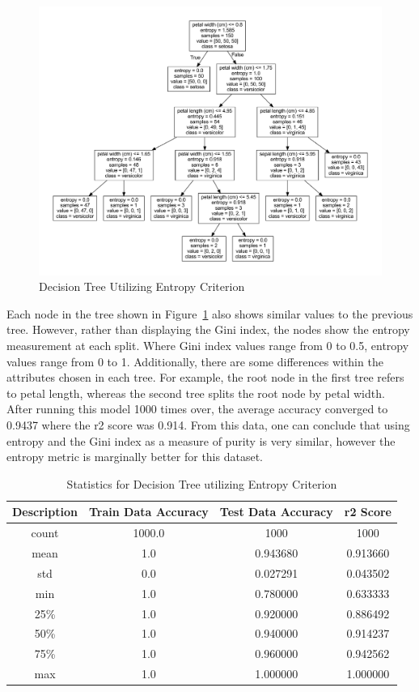 \documentclass[journal]{IEEEtran}
\begin{document}
\begin{figure}[h!]
\includegraphics[scale=0.25]{iris2.pdf}
\centering
\caption{Decision Tree Utilizing Entropy Criterion}
\label{fig:dtEn}
\end{figure}

Each node in the tree shown in Figure~\ref{fig:dtEn} also shows similar values to the previous tree. However, rather than displaying the Gini index, the nodes show the entropy measurement at each split. Where Gini index values range from 0 to 0.5, entropy values range from 0 to 1. Additionally, there are some differences within the attributes chosen in each tree. For example, the root node in the first tree refers to petal length, whereas the second tree splits the root node by petal width. After running this model 1000 times over, the average accuracy converged to 0.9437 where the r2 score was 0.914. From this data, one can conclude that using entropy and the Gini index as a measure of purity is very similar, however the entropy metric is marginally better for this dataset.

\begin{table}[h!]
\centering
\begin{tabular}{ c | c c c }
    Description & Train Data Accuracy & Test Data Accuracy & r2 Score \\ 
\hline
count &              1000.0  &       1000 & 1000\\
mean  &                 1.0  &          0.943680 &    0.913660\\
std   &                 0.0  &          0.027291 &    0.043502\\
min   &                 1.0  &          0.780000 &    0.633333\\
25\%   &                 1.0  &          0.920000 &    0.886492\\
50\%   &                 1.0  &          0.940000 &    0.914237\\
75\%   &                 1.0  &          0.960000 &    0.942562\\
max   &                 1.0  &          1.000000 &    1.000000
\end{tabular}
\caption{Statistics for Decision Tree utilizing Entropy Criterion}
\label{table:dtEn}
\end{table}
\end{document}
